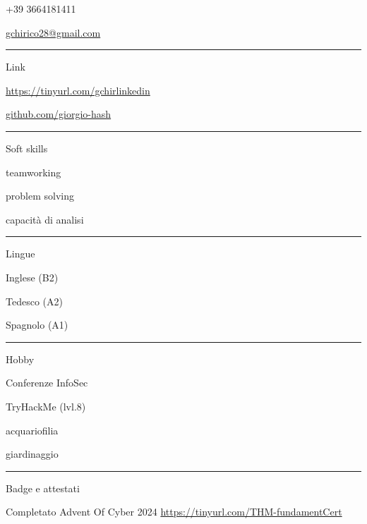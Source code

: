 \documentclass[a4paper]{letter}
\begin{document}
\begin{minipage}[t]{0.30\textwidth}
\faPhone \quad +39 3664181411

\faEnvelope \quad \href{mailto://gchirico28@gmail.com}{gchirico28@gmail.com}

\rule{\linewidth}{0.4pt}

{\large Link}

\faLinkedin \quad \href{https://tinyurl.com/gchirlinkedin}{https://tinyurl.com/gchirlinkedin}

\faGithub \quad \href{https://github.com/giorgio-hash}{github.com/giorgio-hash}

\rule{\linewidth}{0.4pt}

{\large Soft skills}

\faCircleNotch \quad teamworking

\faCircleNotch \quad problem solving

\faCircleNotch \quad capacità di analisi

\rule{\linewidth}{0.4pt}

{\large Lingue}

\faLanguage \quad Inglese  (B2)

\faLanguage \quad Tedesco  (A2)

\faLanguage \quad Spagnolo (A1)

\rule{\linewidth}{0.4pt}

{\large Hobby}

\faLock \quad Conferenze InfoSec

\faCloud \quad TryHackMe (lvl.8)

\faFish \quad acquariofilia

\faLeaf \quad giardinaggio

\rule{\linewidth}{0.4pt}

{\large Badge e attestati}

\faAward \quad Completato Advent Of Cyber 2024 
\href{https://tinyurl.com/THM-fundamentCert}{https://tinyurl.com/THM-fundamentCert}

\end{minipage}
\hfill
\end{document}
